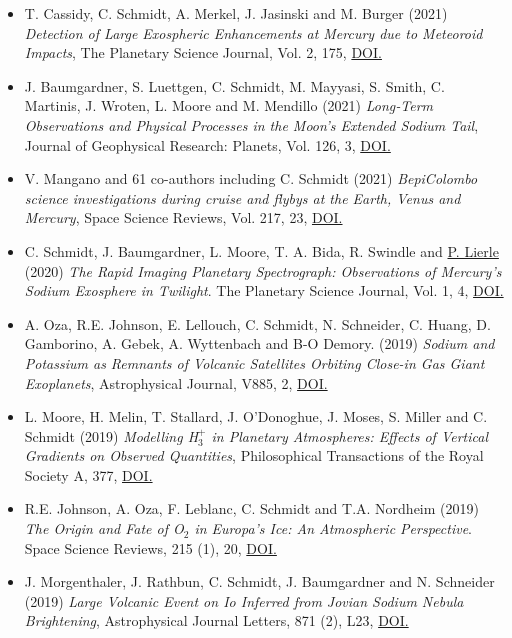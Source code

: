 \documentclass[12pt]{report}
\begin{document}
\begin{itemize}
  \item  T. Cassidy, C. Schmidt, A. Merkel, J. Jasinski and M. Burger (2021) \textit{Detection of Large Exospheric Enhancements at Mercury due to Meteoroid Impacts}, The Planetary Science Journal, Vol. 2, 175, \href{https://doi.org/10.3847/PSJ/ac1a19}{DOI.}
  \item J. Baumgardner, S. Luettgen, C. Schmidt, M. Mayyasi, S. Smith, C. Martinis, J. Wroten, L. Moore and M. Mendillo (2021) \textit{Long‐Term Observations and Physical Processes in the Moon’s Extended Sodium Tail}, Journal of Geophysical Research: Planets, Vol. 126, 3, \href{https://doi.org/10.1029/2020JE006671}{DOI.}
  \item V. Mangano and 61 co-authors including C. Schmidt (2021) \textit{BepiColombo science investigations during cruise and flybys at the Earth, Venus and Mercury}, Space Science Reviews, Vol. 217, 23, \href{https://doi.org/10.1007/s11214-021-00797-9}{DOI.} 
  \item C. Schmidt, J. Baumgardner, L. Moore, T. A. Bida, R. Swindle and \underline{P. Lierle} (2020) \textit{The Rapid Imaging Planetary Spectrograph: Observations of Mercury's Sodium Exosphere in Twilight}. The Planetary Science Journal, Vol. 1, 4, \href{https://doi.org/10.3847/PSJ/ab76c9}{DOI.}
  \item A. Oza, R.E. Johnson, E. Lellouch, C. Schmidt, N. Schneider, C. Huang, D. Gamborino, A. Gebek, A. Wyttenbach and B-O Demory. (2019) \textit{Sodium and Potassium as Remnants of Volcanic Satellites Orbiting Close-in Gas Giant Exoplanets}, Astrophysical Journal, V885, 2, \href{https://doi.org/10.3847/1538-4357/ab40cc}{DOI.}
  \item L. Moore, H. Melin, T. Stallard, J. O'Donoghue, J. Moses, S. Miller and C. Schmidt (2019) \textit{Modelling H$_3^+$ in Planetary Atmospheres: Effects of Vertical Gradients on Observed Quantities}, Philosophical Transactions of the Royal Society A, 377, \href{https://doi.org/10.1098/rsta.2019.0067}{DOI.}
  \item R.E. Johnson, A. Oza, F. Leblanc,  C. Schmidt and T.A. Nordheim (2019) \textit{The Origin and Fate of O$_2$ in Europa's Ice: An Atmospheric Perspective}. Space Science Reviews, 215 (1), 20, \href{https://doi.org/10.1007/s11214-019-0582-1}{DOI.}
  \item J. Morgenthaler, J. Rathbun, C. Schmidt, J. Baumgardner and N. Schneider (2019) \textit{Large Volcanic Event on Io Inferred from Jovian Sodium Nebula Brightening}, Astrophysical Journal Letters, 871 (2), L23, \href{https://doi.org/10.3847/2041-8213/aafdb7}{DOI.}

\end{itemize}
\end{document}
